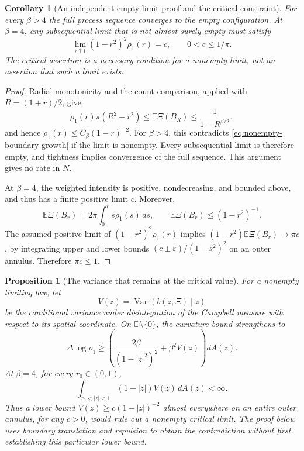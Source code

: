 \documentclass[11pt,a4paper]{article}
\numberwithin{equation}{section}
\newtheorem{proposition}[theorem]{Proposition}
\newtheorem{corollary}[theorem]{Corollary}
\theoremstyle{definition}
\theoremstyle{remark}
\newcommand{\D}{\mathbb D}
\newcommand{\E}{\mathbb E}
\begin{document}
\begin{corollary}[An independent empty-limit proof and the critical constraint]
\label{cor:force-empty-critical}
For every $\beta>4$ the full process sequence converges to the empty
configuration. At $\beta=4$, any subsequential limit that is not almost
surely empty must satisfy
\begin{equation}\label{eq:critical-boundary-intensity-coefficient}
 \lim_{r\uparrow1}(1-r^2)^2\rho_1(r)=c,
 \qquad 0<c\le1/\pi.
\end{equation}
The critical assertion is a necessary condition for a nonempty limit,
not an assertion that such a limit exists.
\end{corollary}

\begin{proof}
Radial monotonicity and the count comparison, applied with
$R=(1+r)/2$, give
\[
 \rho_1(r)\pi(R^2-r^2)
 \le\E\Xi(B_R)\le\frac1{1-R^{\beta/2}},
\]
and hence $\rho_1(r)\le C_\beta(1-r)^{-2}$.
For $\beta>4$, this contradicts
\eqref{eq:nonempty-boundary-growth} if the limit is nonempty.
Every subsequential limit is therefore empty, and tightness implies
convergence of the full sequence. This argument gives no rate in $N$.

At $\beta=4$, the weighted intensity is positive, nondecreasing, and
bounded above, and thus has a finite positive limit $c$. Moreover,
\[
 \E\Xi(B_r)=2\pi\int_0^r s\rho_1(s)\,ds,
 \qquad \E\Xi(B_r)\le(1-r^2)^{-1}.
\]
The assumed positive limit of $(1-r^2)^2\rho_1(r)$ implies
$(1-r^2)\E\Xi(B_r)\to\pi c$, by integrating upper and lower bounds
$(c\pm\varepsilon)/(1-s^2)^2$ on an outer annulus. Therefore
$\pi c\le1$.
\end{proof}

\begin{proposition}[The variance that remains at the critical value]
\label{prop:critical-score-variance}
For a nonempty limiting law, let
\[
 V(z)=\operatorname{Var}(b(z,\Xi)\mid z)
\]
be the conditional variance under disintegration of the Campbell
measure with respect to its spatial coordinate. On $\D\setminus\{0\}$,
the curvature bound strengthens to
\begin{equation}\label{eq:curvature-residual-variance}
 \Delta\log\rho_1
 \ge\left(\frac{2\beta}{(1-|z|^2)^2}+\beta^2V(z)\right)dA(z).
\end{equation}
At $\beta=4$, for every $r_0\in(0,1)$,
\begin{equation}\label{eq:critical-score-integrability}
 \int_{r_0<|z|<1}(1-|z|)V(z)\,dA(z)<\infty.
\end{equation}
Thus a lower bound $V(z)\ge c(1-|z|)^{-2}$ almost everywhere on an
entire outer annulus, for any $c>0$, would rule out a nonempty critical
limit. The proof below uses boundary translation and repulsion to obtain
the contradiction without first establishing this particular lower bound.
\end{proposition}
\end{document}
